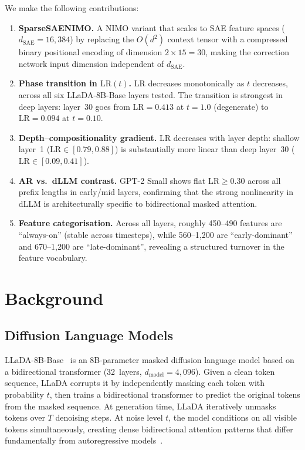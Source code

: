 \documentclass{article}
\newcommand{\LR}{\mathrm{LR}}
\begin{document}
We make the following contributions:
\begin{enumerate}[leftmargin=*]
    \item \textbf{SparseSAENIMO.} A NIMO variant that scales to SAE feature spaces ($d_\mathrm{SAE} = 16{,}384$) by replacing the $O(d^2)$ context tensor with a compressed binary positional encoding of dimension $2 \times 15 = 30$, making the correction network input dimension independent of $d_\mathrm{SAE}$.

    \item \textbf{Phase transition in $\LR(t)$.} LR decreases monotonically as $t$ decreases, across all six LLaDA-8B-Base layers tested. The transition is strongest in deep layers: layer~30 goes from $\LR = 0.413$ at $t = 1.0$ (degenerate) to $\LR = 0.094$ at $t = 0.10$.

    \item \textbf{Depth--compositionality gradient.} LR decreases with layer depth: shallow layer~1 ($\LR \in [0.79, 0.88]$) is substantially more linear than deep layer~30 ($\LR \in [0.09, 0.41]$).

    \item \textbf{AR vs.\ dLLM contrast.} GPT-2 Small shows flat $\LR \ge 0.30$ across all prefix lengths in early/mid layers, confirming that the strong nonlinearity in dLLM is architecturally specific to bidirectional masked attention.

    \item \textbf{Feature categorisation.} Across all layers, roughly 450--490 features are ``always-on'' (stable across timesteps), while 560--1,200 are ``early-dominant'' and 670--1,200 are ``late-dominant'', revealing a structured turnover in the feature vocabulary.
\end{enumerate}

\section{Background}

\subsection{Diffusion Language Models}

LLaDA-8B-Base~\citep{llada2025} is an 8B-parameter masked diffusion language model based on a bidirectional transformer (32~layers, $d_\mathrm{model} = 4{,}096$).
Given a clean token sequence, LLaDA corrupts it by independently masking each token with probability $t$, then trains a bidirectional transformer to predict the original tokens from the masked sequence.
At generation time, LLaDA iteratively unmasks tokens over $T$ denoising steps.
At noise level $t$, the model conditions on all visible tokens simultaneously, creating dense bidirectional attention patterns that differ fundamentally from autoregressive models~\citep{sahoo2024simple,austin2021structured}.
\end{document}
